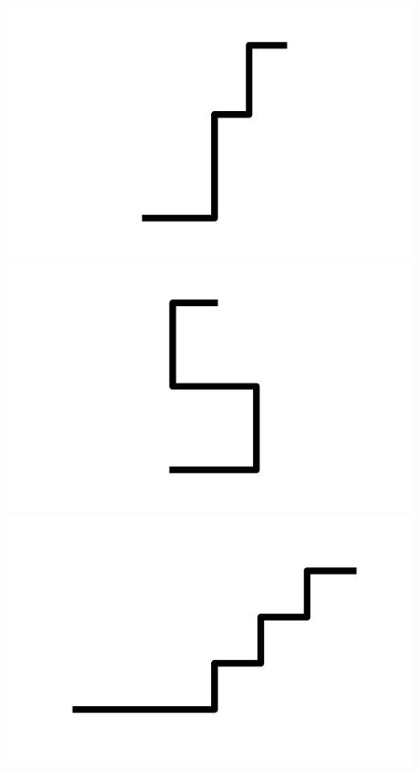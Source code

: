 \documentclass[]{report}
\begin{document}
\includegraphics[scale=.1]{pictures/21/state_cluster_shapes_172.pdf} 
\includegraphics[scale=.1]{pictures/21/state_cluster_shapes_173.pdf} 
\includegraphics[scale=.1]{pictures/21/state_cluster_shapes_174.pdf} 
\end{document}
